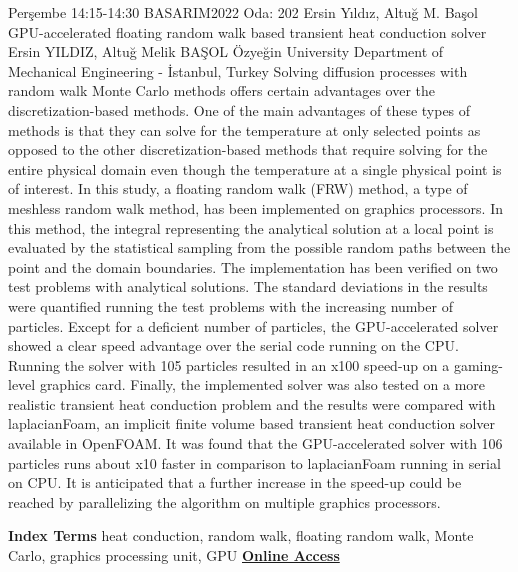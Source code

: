 
    \begin{abstract_basarim}
    {Perşembe 14:15-14:30}
    {BASARIM2022}
    {Oda: 202}
    {Ersin Yıldız, Altuğ M. Başol}
    {GPU-accelerated floating random walk based transient heat conduction solver}
    {%
    Ersin YILDIZ, Altuğ Melik BAŞOL}
    {%
    }
    {%
    Özyeğin University Department of Mechanical Engineering - İstanbul, Turkey}
    Solving diffusion processes with random walk Monte Carlo methods offers certain advantages over the discretization-based methods. One of the main advantages of these types of methods is that they can solve for the temperature at only selected points as opposed to the other discretization-based methods that require solving for the entire physical domain even though the temperature at a single physical point is of interest. In this study, a floating random walk (FRW) method, a type of meshless random walk method, has been implemented on graphics processors. In this method, the integral representing the analytical solution at a local point is evaluated by the statistical sampling from the possible random paths between the point and the domain boundaries. The implementation has been verified on two test problems with analytical solutions. The standard deviations in the results were quantified running the test problems with the increasing number of particles. Except for a deficient number of particles, the GPU-accelerated solver showed a clear speed advantage over the serial code running on the CPU. Running the solver with 105 particles resulted in an x100 speed-up on a gaming-level graphics card. Finally, the implemented solver was also tested on a more realistic transient heat conduction problem and the results were compared with laplacianFoam, an implicit finite volume based transient heat conduction solver available in OpenFOAM. It was found that the GPU-accelerated solver with 106 particles runs about x10 faster in comparison to laplacianFoam running in serial on CPU. It is anticipated that a further increase in the speed-up could be reached by parallelizing the algorithm on multiple graphics processors. 
    
            \textbf{Index Terms} \newline{}heat conduction, random walk, floating random walk, Monte Carlo, graphics processing unit, GPU
     \newline\newline\noindent \href{https://drive.google.com/file/d/1PyNAuX02KaqUL11Btvpg0fHXIWiNTpiH/view?usp=drivesdk}{\bfseries Online Access}
    \end{abstract_basarim}
    